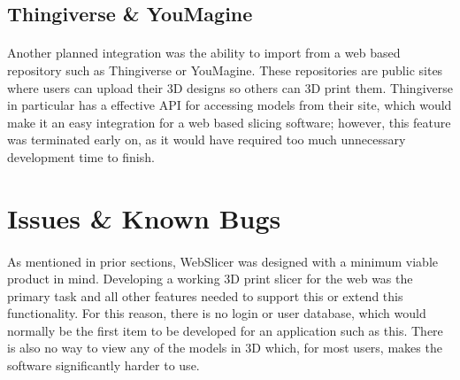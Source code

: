 \subsection{Thingiverse \& YouMagine}
\paragraph{}
Another planned integration was the ability to import from a web based repository such as Thingiverse or YouMagine.
These repositories are public sites where users can upload their 3D designs so others can 3D print them.
Thingiverse in particular has a effective API for accessing models from their site, which would make it an easy integration for a web based slicing software;
however, this feature was terminated early on, as it would have required too much unnecessary development time to finish.

\section{Issues \& Known Bugs}
\paragraph{}
As mentioned in prior sections, WebSlicer was designed with a minimum viable product in mind.
Developing a working 3D print slicer for the web was the primary task and all other features needed to support this or extend this functionality.
For this reason, there is no login or user database, which would normally be the first item to be developed for an application such as this.
There is also no way to view any of the models in 3D which, for most users, makes the software significantly harder to use.
